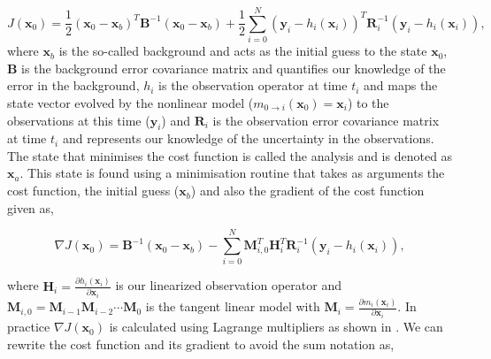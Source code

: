 \documentclass[11pt]{article}
\begin{document}
\begin{equation}
J(\textbf{x}_0) = \frac{1}{2}(\textbf{x}_0-\textbf{x}_b)^{T}\textbf{B}^{-1}(\textbf{x}_0-\textbf{x}_b)+\frac{1}{2}\sum_{i=0}^{N}(\textbf{y}_i-h_i(\textbf{x}_i))^{T}\textbf{R}_{i}^{-1}(\textbf{y}_i-h_i(\textbf{x}_i)),
\end{equation}
where $\textbf{x}_b$ is the so-called background and acts as the initial guess to the state $\textbf{x}_0$, $\textbf{B}$ is the background error covariance matrix and quantifies our knowledge of the error in the background, $h_i$ is the observation operator at time $t_i$ and maps the state vector evolved by the nonlinear model ($m_{0\rightarrow i}(\mathbf{x}_{0})=\textbf{x}_i$) to the observations at this time ($\textbf{y}_i$) and $\textbf{R}_i$ is the observation error covariance matrix at time $t_i$ and represents our knowledge of the uncertainty in the observations. The state that minimises the cost function is called the analysis and is denoted as $\textbf{x}_a$. This state is found using a minimisation routine that takes as arguments the cost function, the initial guess ($\textbf{x}_b$) and also the gradient of the cost function given as,

\begin{equation}
\nabla J(\textbf{x}_0) = \textbf{B}^{-1}(\textbf{x}_0-\textbf{x}_b)-\sum_{i=0}^{N}\textbf{M}_{i,0}^{T}\textbf{H}_i^{T}\textbf{R}_{i}^{-1}(\textbf{y}_i-h_i(\textbf{x}_i)),
\end{equation}

where $\textbf{H}_i = \frac{\partial h_i(\textbf{x}_i)}{\partial\textbf{x}_i}$ is our linearized observation operator and $\mathbf{M}_{i,0}=\mathbf{M}_{i-1}\mathbf{M}_{i-2}\cdots\mathbf{M}_0$ is the tangent linear model with $\mathbf{M}_i=\frac{\partial m_{i}(\textbf{x}_{i})}{\partial \textbf{x}_{i}}$. In practice $\nabla J(\textbf{x}_0)$ is calculated using Lagrange multipliers as shown in \citet{lawless2013}. We can rewrite the cost function and its gradient to avoid the sum notation as,
\end{document}

